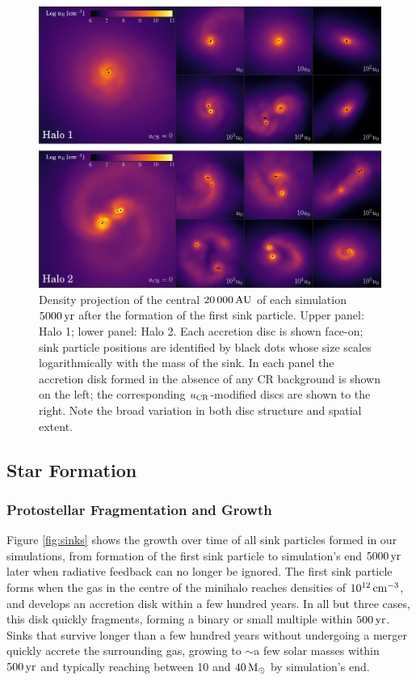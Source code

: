 \documentclass[usenatbib]{mn2e}
\newcommand{\cc}{\,{\rm cm}^{-3}}
\newcommand{\msun}{\,{\rm M}_{\odot}}
\newcommand{\au}{\,{\rm AU}}
\newcommand{\yr}{\,{\rm yr}}
\newcommand{\ucr}{{u}_{\rm \small CR}}
\begin{document}
\begin{figure}
\begin{center}
\includegraphics[width=1\textwidth]{figures/disks/disks}
\caption{\label{fig:disks} 
Density projection of the central $20\,000\au$ of each simulation $5000\yr$ after the formation of the first sink particle.
Upper panel: Halo 1; lower panel: Halo 2.
Each accretion disc is shown face-on; sink particle positions are identified by black dots whose size scales logarithmically with the mass of the sink.
In each panel the accretion disk formed in the absence of any CR background is shown on the left; the corresponding $\ucr$-modified discs are shown to the right.
Note the broad variation in both disc structure and spatial extent.%
}
\end{center}
\end{figure}

\subsection{Star Formation}
\subsubsection{Protostellar Fragmentation and Growth}
\label{sec:sink_formation}

Figure \ref{fig:sinks} shows the growth over time of all sink particles formed in our simulations, from formation of the first sink particle to simulation's end $5000\yr$ later when radiative feedback can no longer be ignored. 
The first sink particle forms when the gas in the centre of the minihalo reaches densities of $10^{12}\cc$, and develops an accretion disk within a few hundred years. 
In all but three cases, this disk quickly fragments, forming a binary or small multiple within $500\yr$. 
Sinks that survive longer than a few hundred years without undergoing a merger quickly accrete the surrounding gas, growing to $\sim$a few solar masses within $500\yr$ and typically reaching between 10 and $40\msun$ by simulation's end.
\end{document}
